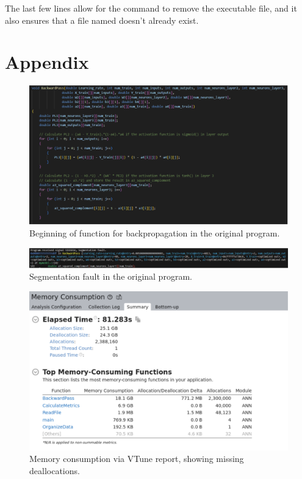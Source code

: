 \documentclass[12pt]{article}
\begin{document}
The last few lines allow for the  command to remove the executable file, and it also ensures that a file named  doesn’t already exist.

\section{Appendix}

\begin{figure}[h]
    \centering
    \includegraphics[width=\textwidth]{Figure1.png}
    \caption{Beginning of  function for backpropagation in the original program.}
    \label{fig:figure1}
\end{figure}

\begin{figure}[h]
    \centering
    \includegraphics[width=\textwidth]{Figure2.png}
    \caption{Segmentation fault in the original program.}
    \label{fig:figure2}
\end{figure}

\begin{figure}[h]
    \centering
    \includegraphics[width=\textwidth]{Figure3.png}
    \caption{Memory consumption via VTune report, showing missing deallocations.}
    \label{fig:figure3}
\end{figure}
\end{document}
